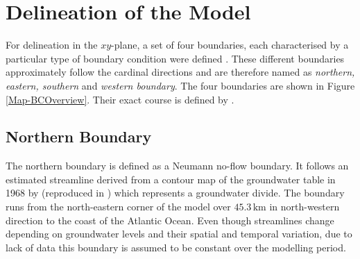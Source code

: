 
\section{Delineation of the Model}
\label{Sec-Delineation}

For delineation in the $xy$-plane, a set of four boundaries, each characterised by a particular type of boundary condition were defined \parencite{Anzar.2016}. 
These different boundaries approximately follow the cardinal directions and are therefore named as \textit{northern, eastern, southern} and \textit{western boundary}. 
The four boundaries are shown in Figure  \ref{Map-BCOverview}. 
Their exact course is defined by \textcite{Anzar.2016}.


\subsection{Northern Boundary}

The northern boundary is defined as a Neumann no-flow boundary. 
It follows an estimated streamline derived from a contour map of the groundwater table in 1968 by \textcite{Bernet.1968} (reproduced in \cite{Bernet.1977}) which represents a groundwater divide. 
The boundary runs from the north-eastern corner of the model over $45.3 \, \textrm{km}$ in north-western direction to the coast of the Atlantic Ocean. 
Even though streamlines change depending on groundwater levels and their spatial and temporal variation, due to lack of data this boundary is assumed to be constant over the modelling period.

